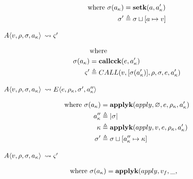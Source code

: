 \documentclass[12pt,draft]{article}
\newcommand{\E}[4]{E\langle #1 , #2 , #3 , #4 \rangle}
\newcommand{\A}[4]{A\langle #1 , #2 , #3 , #4 \rangle}
\begin{document}
\begin{multicols*}{2}
\begin{center}
  \end{center}
  \vspace{-7mm}
  \begin{align*}
    \text{where }
    \sigma(a_{\kappa}) &= \textbf{setk}(a , a_{\kappa}') \\
    \sigma' &\triangleq \sigma \sqcup [a \mapsto v]
  \end{align*}
  \begin{center}
    $\A{v}{\cenv}{\cstore}{\ckaddr}$
    $\leadsto \varsigma'$
  \end{center}
  \vspace{-7mm}
  \begin{align*}
    &\text{where} \\
    \sigma(a_{\kappa}) &= \textbf{callcck}(e , a_{\kappa}') \\
    \varsigma' &\triangleq CALL(v , [\sigma(a_{\kappa}')] ,
               \rho , \sigma , e , a_{\kappa}') \\
  \end{align*}
  \vfill\null
  \columnbreak
  \begin{center}
    $\A{v}{\cenv}{\cstore}{\ckaddr}$
    $\leadsto \E{e}{\cenv_{\ckont}}{\cstore'}{\ckaddr''}$
  \end{center}
  \vspace{-7mm}
  \begin{align*}
    \text{where }
    \sigma(a_{\kappa}) &= \textbf{applyk}(apply , \varnothing , e ,
                       \rho_{\kappa} , a_{\kappa}') \\
    a_{\kappa}'' &\triangleq |\sigma| \\
    \kappa &\triangleq \textbf{applyk}(apply , v , e , \rho_{\kappa} , a_{\kappa}') \\
    \sigma' &\triangleq \sigma \sqcup [a_{\kappa}'' \mapsto \kappa]
  \end{align*}
  \begin{center}
    $\A{v}{\cenv}{\cstore}{\ckaddr}$
    $\leadsto \varsigma'$
  \end{center}
  \vspace{-7mm}
  \begin{align*}
    \text{where }
    \cstore(\ckaddr) &= \textbf{applyk}(apply , v_f , \_ ,

\end{align*}
\end{multicols*}
\end{document}
